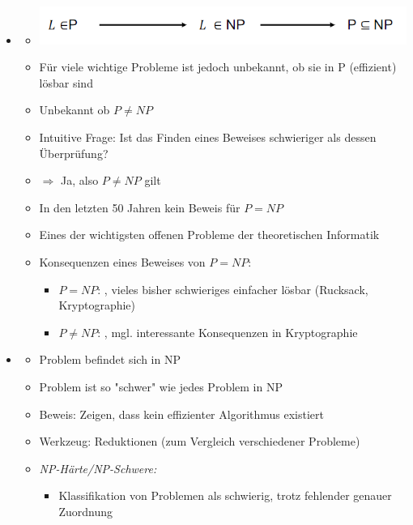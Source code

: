 \documentclass[
    12pt,
    a4paper,
    ngerman,
    color=3b,%
    marginpar=false,
    colorback=false,
    leqno,
]{tudaexercise}
\begin{document}
\begin{itemize}
    \item {}
          \begin{itemize}
              \item[] \includegraphics[width=12cm]{pictures/pnp.PNG}
              \item Für viele wichtige Probleme ist jedoch unbekannt, ob sie in P (effizient) lösbar sind
              \item Unbekannt ob $P \neq NP$
              \item Intuitive Frage: Ist das Finden eines Beweises schwieriger als dessen Überprüfung?
              \item[] $\Rightarrow$ Ja, also $P \neq NP$ gilt
              \item In den letzten 50 Jahren kein Beweis für $P = NP$
              \item Eines der wichtigsten offenen Probleme der theoretischen Informatik
              \item Konsequenzen eines Beweises von $P=NP$:
                    \begin{itemize}
                        \item $P=NP$: , vieles bisher schwieriges einfacher lösbar (Rucksack, Kryptographie)
                        \item $P\neq NP$: , mgl. interessante Konsequenzen in Kryptographie
                    \end{itemize}
          \end{itemize}
          \clearpage
    \item {}
          \begin{itemize}
              \item Problem befindet sich in NP
              \item Problem ist so \string"schwer\string" wie jedes Problem in NP
              \item Beweis: Zeigen, dass kein effizienter Algorithmus existiert
              \item Werkzeug: Reduktionen (zum Vergleich verschiedener Probleme)
              \item \textit{NP-Härte/NP-Schwere:}
                    \begin{itemize}
                        \item Klassifikation von Problemen als schwierig, trotz fehlender genauer Zuordnung

\end{itemize}
\end{itemize}
\end{itemize}
\end{document}
